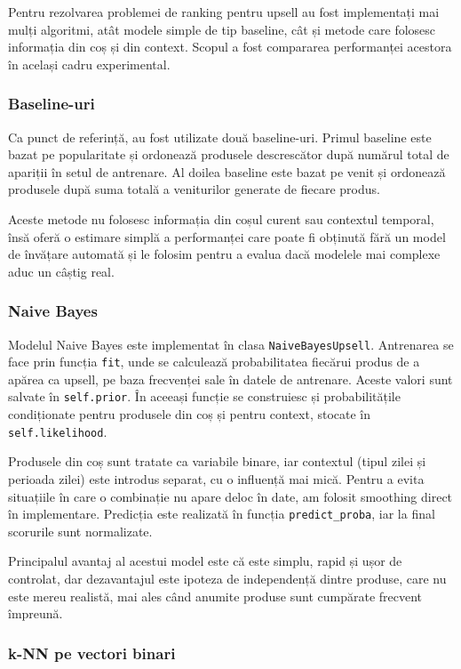 \documentclass[12pt,a4paper]{article}
\begin{document}
Pentru rezolvarea problemei de ranking pentru upsell au fost implementați mai mulți algoritmi, atât modele simple de tip baseline, cât și metode care folosesc informația din coș și din context. Scopul a fost compararea performanței acestora în același cadru experimental.

\subsubsection{Baseline-uri}

Ca punct de referință, au fost utilizate două baseline-uri. Primul baseline este bazat pe popularitate și ordonează produsele descrescător după numărul total de apariții în setul de antrenare. Al doilea baseline este bazat pe venit și ordonează produsele după suma totală a veniturilor generate de fiecare produs.

Aceste metode nu folosesc informația din coșul curent sau contextul temporal, însă oferă o estimare simplă a performanței care poate fi obținută fără un model de învățare automată și le folosim pentru a evalua dacă modelele mai complexe aduc un câștig real.

\subsubsection{Naive Bayes}

Modelul Naive Bayes este implementat în clasa \texttt{NaiveBayesUpsell}. Antrenarea se face prin funcția \texttt{fit}, unde se calculează probabilitatea fiecărui produs de a apărea ca upsell, pe baza frecvenței sale în datele de antrenare. Aceste valori sunt salvate în \texttt{self.prior}. În aceeași funcție se construiesc și probabilitățile condiționate pentru produsele din coș și pentru context, stocate în \texttt{self.likelihood}.

Produsele din coș sunt tratate ca variabile binare, iar contextul (tipul zilei și perioada zilei) este introdus separat, cu o influență mai mică. Pentru a evita situațiile în care o combinație nu apare deloc în date, am folosit smoothing direct în implementare. Predicția este realizată în funcția \texttt{predict\_proba}, iar la final scorurile sunt normalizate.

Principalul avantaj al acestui model este că este simplu, rapid și ușor de controlat, dar dezavantajul este ipoteza de independență dintre produse, care nu este mereu realistă, mai ales când anumite produse sunt cumpărate frecvent împreună.


\subsubsection{k-NN pe vectori binari}
\end{document}
